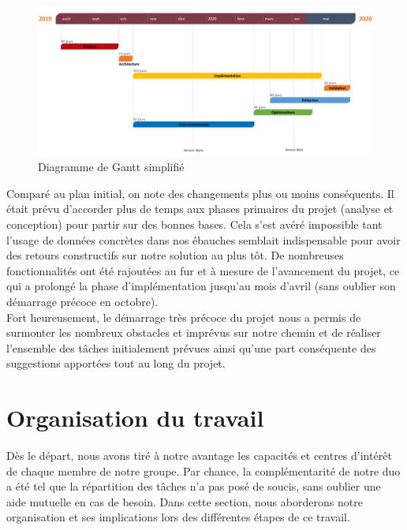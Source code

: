 \begin{figure}[H]
    \includegraphics[width=\textwidth,height=\textheight,keepaspectratio]{images/planning.png}
    \centering
    \caption{Diagramme de Gantt simplifié}
\end{figure}

Comparé au plan initial, on note des changements plus ou moins conséquents. Il était prévu d'accorder plus de temps aux phases primaires du projet (analyse et conception) pour partir sur des bonnes bases. Cela s'est avéré impossible tant l'usage de données concrètes dans nos ébauches semblait indispensable pour avoir des retours constructifs sur notre solution au plus tôt. De nombreuses fonctionnalités ont été rajoutées au fur et à mesure de l'avancement du projet, ce qui a prolongé la phase d'implémentation jusqu'au mois d'avril (sans oublier son démarrage précoce en octobre). \\

Fort heureusement, le démarrage très précoce du projet nous a permis de surmonter les nombreux obstacles et imprévus sur notre chemin et de réaliser l'ensemble des tâches initialement prévues ainsi qu'une part conséquente des suggestions apportées tout au long du projet. \\

\section{Organisation du travail}

Dès le départ, nous avons tiré à notre avantage les capacités et centres d'intérêt de chaque membre de notre groupe. Par chance, la complémentarité de notre duo a été tel que la répartition des tâches n'a pas posé de soucis, sans oublier une aide mutuelle en cas de besoin. Dans cette section, nous aborderons notre organisation et ses implications lors des différentes étapes de ce travail.\\

